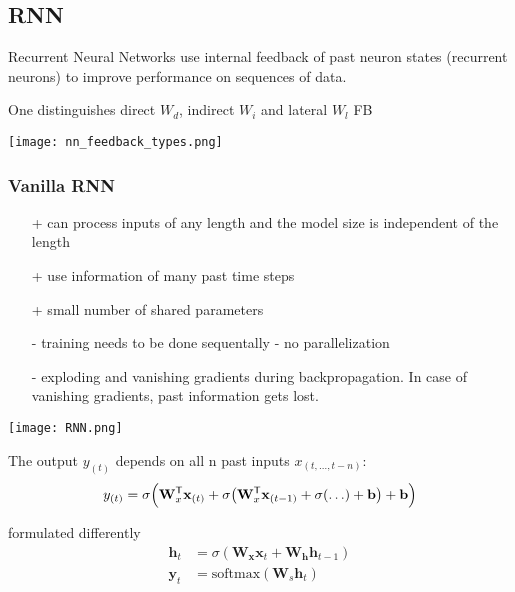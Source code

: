 
\subsection{RNN}\label{sec:RNN}
Recurrent Neural Networks use internal feedback of past neuron states (recurrent neurons) to improve performance on sequences of data.

\newpar{}

One distinguishes direct $W_d$, indirect $W_i$ and lateral $W_l$ FB
\begin{center}
    \texttt{[image: nn\_feedback\_types.png]}
\end{center}

\subsubsection{Vanilla RNN}

\begin{itemize}
    \item[+] can process inputs of any length and the model size is independent of the length
    \item[+] use information of many past time steps
    \item[+] small number of shared parameters
    \item[-] training needs to be done sequentally - no parallelization
    \item[-] exploding and vanishing gradients during backpropagation. In case of vanishing gradients, past information gets lost.
\end{itemize}

\newpar{}
\begin{center}
    \texttt{[image: RNN.png]}
\end{center}
The output $y_{(t)}$ depends on all n past inputs $x_{(t,\ldots,t-n)}$:
\noindent\begin{equation*}
    y_{(t)} = \sigma\Bigl(\mathbf{W}_x^{\mathsf{T}}\mathbf{x}_{(t)} + \sigma\bigl(\mathbf{W}_x^{\mathsf{T}}\mathbf{x}_{(t-1)} + \sigma( \ldots ) + \mathbf{b}\bigr) + \mathbf{b}\Bigr)
\end{equation*}

formulated differently
\noindent\begin{align*}
    \mathbf{h}_t & = \sigma(\mathbf{W}_\mathbf{x} \mathbf{x}_t + \mathbf{W}_\mathbf{h} \mathbf{h}_{t-1}) \\
    \mathbf{y}_t & = \mathrm{softmax}(\mathbf{W}_s \mathbf{h}_t)
\end{align*}


